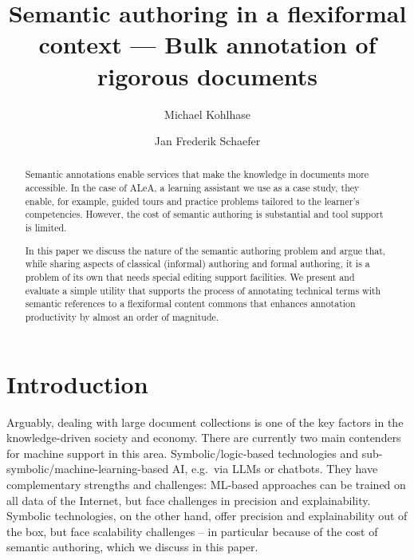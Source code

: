 \documentclass[runningheads]{llncs}
\title{
Semantic authoring in a flexiformal context --- Bulk annotation of rigorous documents
}
\author{Michael Kohlhase\orcidlink{0000-0002-9859-6337} \and Jan Frederik Schaefer\orcidlink{0000-0003-2545-4626}}
\institute{Computer Science, FAU Erlangen N\"urnberg, Germany}
\newcommand\ALeA{\textsf{ALeA}\xspace}
\begin{document}
\maketitle
\begin{abstract}
% 

    Semantic annotations enable services that make the knowledge
    in documents more accessible.
    In the case of \ALeA, a learning assistant we use as a case study,
    they enable, for example, guided tours and practice problems
    tailored to the learner's competencies.
    However, the cost of semantic authoring is substantial
    and tool support is limited.

    In this paper we discuss the nature of the semantic authoring
    problem and argue that, while sharing aspects of classical
    (informal) authoring and formal authoring,
    it is a problem of its own that needs special editing support facilities.
    We present and evaluate a simple utility that supports the process of annotating
    technical terms with semantic references to a flexiformal content commons
    that enhances annotation productivity by almost an order of magnitude.
\end{abstract}

\section{Introduction}
Arguably, dealing with large document collections is one of the key factors in the knowledge-driven society and economy.
There are currently two main contenders for machine support in this area.
Symbolic/logic-based technologies and sub-symbolic/machine-learning-based AI, e.g.\ via LLMs or chatbots.
They have complementary strengths and challenges:
ML-based approaches can be trained on all data of the Internet, but face challenges in precision and explainability. 
Symbolic technologies, on the other hand, offer precision and explainability out of the box, but face scalability challenges
-- in particular because of the cost of semantic authoring, which we discuss in this paper.
\end{document}
